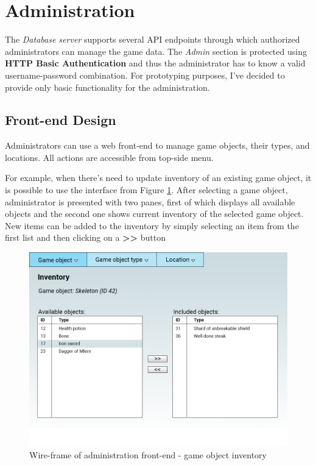\section{Administration}
The \textit{Database server} supports several API endpoints through which authorized administrators can manage the game data. The \textit{Admin} section is protected using \textbf{HTTP Basic Authentication} and thus the administrator has to know a valid username-password combination. For prototyping purposes, I've decided to provide only basic functionality for the administration.

	\subsection{Front-end Design}
	Administrators can use a web front-end to manage game objects, their types, and locations. All actions are accessible from top-side menu. 
	
	For example, when there's need to update inventory of an existing game object, it is possible to use the interface from Figure \ref{fig:wireframegameobject}. After selecting a game object, administrator is presented with two panes, first of which displays all available objects and the second one shows current inventory of the selected game object. New items can be added to the inventory by simply selecting an item from the first list and then clicking on a \textbf{>>} button
	
	\begin{figure}[h]	
		\includegraphics[width=\textwidth]{figures/GameObjectAdminWireframe}
		\centering			
		\caption{Wire-frame of administration front-end - game object inventory}
		\label{fig:wireframegameobject}
	\end{figure}	
	

